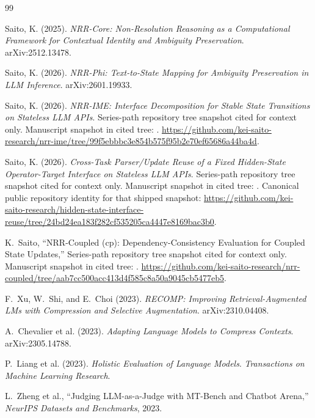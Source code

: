 \documentclass[11pt,a4paper]{article}
\begin{document}
\begin{thebibliography}{99}\sloppy

Saito, K. (2025).
\textit{NRR-Core: Non-Resolution Reasoning as a Computational Framework for Contextual Identity and Ambiguity Preservation}.
arXiv:2512.13478.

Saito, K. (2026).
\textit{NRR-Phi: Text-to-State Mapping for Ambiguity Preservation in LLM Inference}.
arXiv:2601.19933.

Saito, K. (2026).
\textit{NRR-IME: Interface Decomposition for Stable State Transitions on Stateless LLM APIs}.
Series-path repository tree snapshot cited for context only. Manuscript snapshot in cited tree: . \url{https://github.com/kei-saito-research/nrr-ime/tree/99f5ebbbc3e854b575f95b2e70ef65686a44ba4d}.

Saito, K. (2026).
\textit{Cross-Task Parser/Update Reuse of a Fixed Hidden-State Operator-Target Interface on Stateless LLM APIs}.
Series-path repository tree snapshot cited for context only. Manuscript snapshot in cited tree: . Canonical public repository identity for that shipped snapshot: \url{https://github.com/kei-saito-research/hidden-state-interface-reuse/tree/24bd24ea183f282cf535205ca4447e8169bac3b0}.

K.~Saito,
\newblock ``NRR-Coupled (cp): Dependency-Consistency Evaluation for Coupled State Updates,''
\newblock Series-path repository tree snapshot cited for context only. Manuscript snapshot in cited tree:
.
\url{https://github.com/kei-saito-research/nrr-coupled/tree/aab7cc500acc413d4f585c8a50a9045cb5477eb5}.

F.~Xu, W.~Shi, and E.~Choi (2023).
\textit{RECOMP: Improving Retrieval-Augmented LMs with Compression and Selective Augmentation}.
arXiv:2310.04408.

A.~Chevalier et al. (2023).
\textit{Adapting Language Models to Compress Contexts}.
arXiv:2305.14788.

P.~Liang et al. (2023). \textit{Holistic Evaluation of Language Models}.
\emph{Transactions on Machine Learning Research}.

L.~Zheng et al.,
\newblock ``Judging LLM-as-a-Judge with MT-Bench and Chatbot Arena,''
\newblock \emph{NeurIPS Datasets and Benchmarks}, 2023.


\end{thebibliography}
\end{document}
